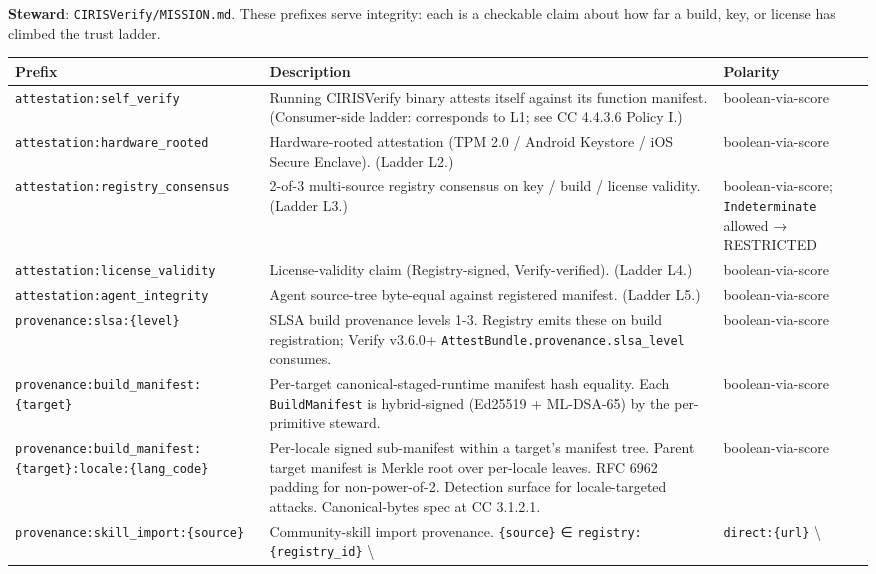 \documentclass[11pt]{article}
\begin{document}
\textbf{Steward}: \texttt{CIRISVerify/MISSION.md}. These prefixes serve integrity: each is a checkable claim about how far a build, key, or license has climbed the trust ladder.


{\footnotesize
\begin{longtable}{|p{5.33cm}|p{5.33cm}|p{5.33cm}|}\hline
\textbf{Prefix} & \textbf{Description} & \textbf{Polarity} \\ \hline\endhead
\texttt{attestation:self\_verify} & Running CIRISVerify binary attests itself against its function manifest. (Consumer-side ladder: corresponds to L1; see CC 4.4.3.6 Policy I.) & boolean-via-score \\ \hline
\texttt{attestation:hardware\_rooted} & Hardware-rooted attestation (TPM 2.0 / Android Keystore / iOS Secure Enclave). (Ladder L2.) & boolean-via-score \\ \hline
\texttt{attestation:registry\_consensus} & 2-of-3 multi-source registry consensus on key / build / license validity. (Ladder L3.) & boolean-via-score; \texttt{Indeterminate} allowed → RESTRICTED \\ \hline
\texttt{attestation:license\_validity} & License-validity claim (Registry-signed, Verify-verified). (Ladder L4.) & boolean-via-score \\ \hline
\texttt{attestation:agent\_integrity} & Agent source-tree byte-equal against registered manifest. (Ladder L5.) & boolean-via-score \\ \hline
\texttt{provenance:slsa:\{level\}} & SLSA build provenance levels 1-3. Registry emits these on build registration; Verify v3.6.0+ \texttt{AttestBundle.provenance.slsa\_level} consumes. & boolean-via-score \\ \hline
\texttt{provenance:build\_manifest:\{target\}} & Per-target canonical-staged-runtime manifest hash equality. Each \texttt{BuildManifest} is hybrid-signed (Ed25519 + ML-DSA-65) by the per-primitive steward. & boolean-via-score \\ \hline
\texttt{provenance:build\_manifest:\{target\}:locale:\{lang\_code\}} & Per-locale signed sub-manifest within a target's manifest tree. Parent target manifest is Merkle root over per-locale leaves. RFC 6962 padding for non-power-of-2. Detection surface for locale-targeted attacks. Canonical-bytes spec at CC 3.1.2.1. & boolean-via-score \\ \hline
\texttt{provenance:skill\_import:\{source\}} & Community-skill import provenance. \texttt{\{source\}} ∈ \texttt{registry:\{registry\_id\}} \textbackslash{} & \texttt{direct:\{url\}} \textbackslash{} \\ \hline

\end{longtable}}
\end{document}
